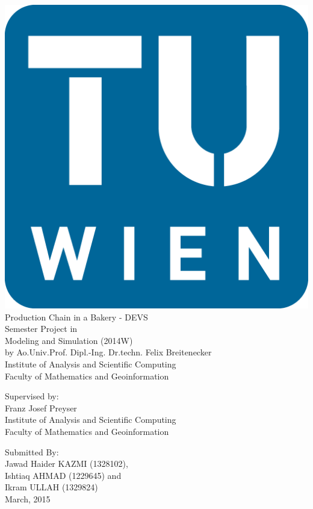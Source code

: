 \documentclass[titlepage]{report}%
\begin{document}
\pagestyle{empty}
\begin{center}
\includegraphics[scale=0.3]{TU-Signet.png}
\vspace{1cm}
{\huge \\Production Chain in a Bakery - DEVS\\}
\vspace{1cm}
{\Large Semester Project in\\}
\vspace{1cm}
{\Large Modeling and Simulation (2014W)\\}
{\large by Ao.Univ.Prof. Dipl.-Ing. Dr.techn. Felix  Breitenecker\\}
{Institute of Analysis and Scientific Computing\\}
{Faculty of Mathematics and Geoinformation\\}

\vspace{2cm}
{Supervised by:\\}
\vspace{0.3cm}
{Franz Josef Preyser\\}
{Institute of Analysis and Scientific Computing\\}
{Faculty of Mathematics and Geoinformation\\}

\vspace{2cm}
{Submitted By:\\}
\vspace{0.3cm}
{Jawad Haider KAZMI (1328102), \\ Ishtiaq AHMAD (1229645) and \\ Ikram ULLAH (1329824) \\}						%
\vspace{2cm}
March, 2015
\end{center}
\end{document}
